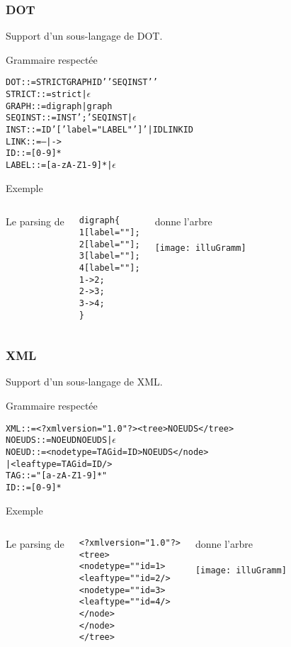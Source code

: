 \begin{frame}
    \frametitle{DOT}
    Support d'un sous-langage de DOT.\\
    \begin{block}{Grammaire respectée}
    \begin{alltt}
    DOT ::= STRICT GRAPH ID '{' SEQINST '}'
    STRICT ::= strict | \(\epsilon\)
    GRAPH ::= digraph | graph
    SEQINST ::= INST ';' SEQINST | \(\epsilon\)
    INST ::= ID '[' label = "LABEL" ']' | ID LINK ID
    LINK ::= -- | ->
    ID ::= [0-9]*
    LABEL ::= [a-zA-Z1-9]* | \(\epsilon\)
    \end{alltt}
    \end{block}
    \begin{exampleblock}{Exemple}
	    \begin{columns}[t]
		Le parsing de \\
		\centering
		\begin{alltt}
	    digraph \{
	    1 [label=""];
	    2 [label=""];
	    3 [label=""];
	    4 [label=""];
	    1 -> 2;
	    2 -> 3;
	    3 -> 4;
	    \}
		\end{alltt}
		donne l'arbre\\
		~\\
		\texttt{[image: illuGramm]}
		\end{columns}
    \end{exampleblock}
\end{frame}

\begin{frame}
    \frametitle{XML}
    Support d'un sous-langage de XML.\\
    \begin{block}{Grammaire respectée}
    \begin{alltt}
    XML ::= <?xml version="1.0"?><tree> NOEUDS </tree>
    NOEUDS ::= NOEUD NOEUDS | \(\epsilon\)
    NOEUD ::= <node type=TAG id=ID> NOEUDS </node>
            | <leaf type=TAG id=ID />
    TAG ::= " [a-zA-Z1-9]* "
    ID ::= [0-9]*
    \end{alltt}
    \end{block}
    \begin{exampleblock}{Exemple}
	    \begin{columns}[t]
		Le parsing de \\
		\centering
	    \begin{alltt}
	    <?xml version="1.0"?>
	    <tree>
	        <node type="" id=1>
	            <leaf type="" id=2 />
	            <node type="" id=3>
	                <leaf type="" id=4 />
	            </node>
	    	    </node>
	    </tree>
    \end{alltt}
		donne l'arbre\\
		~\\
		\texttt{[image: illuGramm]}
		\end{columns}
    \end{exampleblock}
\end{frame}

